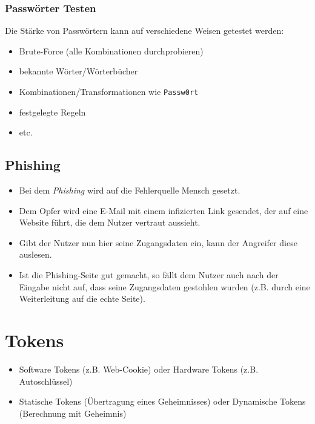             \subsubsection{Passwörter Testen}
                Die Stärke von Passwörtern kann auf verschiedene Weisen getestet werden:
                \begin{itemize}
                	\item Brute-Force (alle Kombinationen durchprobieren)
                	\item bekannte Wörter/Wörterbücher
                	\item Kombinationen/Transformationen wie \texttt{Passw0rt}
                	\item festgelegte Regeln
                	\item etc.
                \end{itemize}

        \subsection{Phishing}
            \begin{itemize}
            	\item Bei dem \textit{Phishing} wird auf die Fehlerquelle Mensch gesetzt.
            	\item Dem Opfer wird eine E-Mail mit einem infizierten Link gesendet, der auf eine Website führt, die dem Nutzer vertraut aussieht.
            	\item Gibt der Nutzer nun hier seine Zugangsdaten ein, kann der Angreifer diese auslesen.
            	\item Ist die Phishing-Seite gut gemacht, so fällt dem Nutzer auch nach der Eingabe nicht auf, dass seine Zugangsdaten gestohlen wurden (z.B. durch eine Weiterleitung auf die echte Seite).
            \end{itemize}

    \section{Tokens}
        \begin{itemize}
        	\item Software Tokens (z.B. Web-Cookie) oder Hardware Tokens (z.B. Autoschlüssel)
        	\item Statische Tokens (Übertragung eines Geheimnisses) oder Dynamische Tokens (Berechnung mit Geheimnis)
        \end{itemize}


